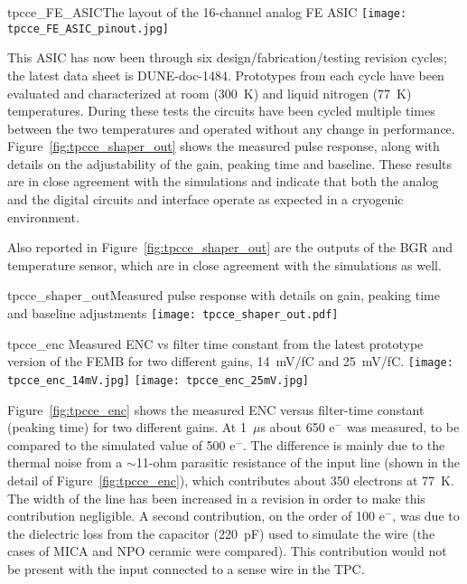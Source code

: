 \begin{cdrfigure}{tpcce_FE_ASIC}{The layout of the 16-channel analog FE ASIC}
\texttt{[image: tpcce\_FE\_ASIC\_pinout.jpg]}
\end{cdrfigure}

This ASIC has now been through six design/fabrication/testing revision cycles; the latest data sheet is DUNE-doc-1484.
Prototypes from each cycle have been evaluated and characterized at room (300~K) and liquid nitrogen (77~K) temperatures.
During these tests the circuits have been cycled multiple times
between the two temperatures and operated without any change in performance.
Figure~\ref{fig:tpcce_shaper_out} shows the measured pulse response, along with
details on the adjustability of the gain, peaking time and baseline.
These results are in close agreement with the simulations and indicate
that both the analog and the digital circuits and interface operate as
expected in a cryogenic environment.

Also reported in Figure~\ref{fig:tpcce_shaper_out} are the outputs of the BGR and temperature sensor,
which are in close agreement with the simulations as well.

\begin{cdrfigure}{tpcce_shaper_out}{Measured pulse response with details on gain, peaking time and baseline adjustments}
\texttt{[image: tpcce\_shaper\_out.pdf]}
\end{cdrfigure}

\begin{cdrfigure}{tpcce_enc}{
Measured ENC vs filter time constant from the latest prototype version of the FEMB
for two different gains, 14~mV/fC and 25~mV/fC.}
\texttt{[image: tpcce\_enc\_14mV.jpg]}
\texttt{[image: tpcce\_enc\_25mV.jpg]}
\end{cdrfigure}


Figure~\ref{fig:tpcce_enc} shows the measured ENC versus filter-time constant (peaking time) for two different gains.
At 1~$\mu$s about 650 e$^{-}$ was measured, to be compared to the simulated value of 500 e$^{-}$.
The difference is mainly due to the thermal noise from a $\sim$11-ohm parasitic resistance of the input
line (shown in the detail of Figure~\ref{fig:tpcce_enc}), which contributes about 350 electrons at 77~K.
The width of the line has been increased in a revision in order to make this contribution negligible.
A second contribution, on the order of 100 e$^{-}$,
was due to the dielectric loss from the capacitor (220~pF) used to simulate the wire
(the cases of MICA and NPO ceramic were compared).
This contribution would not be present with the input connected to a sense wire in the TPC.

